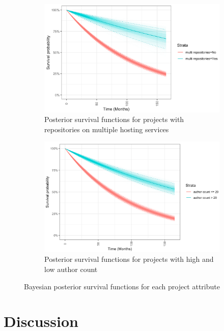 \documentclass[acmconf]{acmart}
\begin{document}
\begin{figure}[!ht]
\begin{subfigure}[b]{0.45\columnwidth}
        \includegraphics[width=\textwidth]{multi_repo_bayes.png}
        \caption{\small Posterior survival functions for projects with repositories on multiple hosting services}
        \label{fig:bayes_multi_repo}
    \end{subfigure}
    \hfill
    \begin{subfigure}[b]{0.45\columnwidth}
        \centering 
        \includegraphics[width=\textwidth]{author_count_bayes.png} 
        \caption{\small Posterior survival functions for projects with high and low author count}
        \label{fig:bayes_author_count}
    \end{subfigure}
    \caption{\small Bayesian posterior survival functions for each project attribute} 
    \label{fig:Bayesian posterior survival functions}
\end{figure}

\section{Discussion} \label{discussion}
\end{document}
